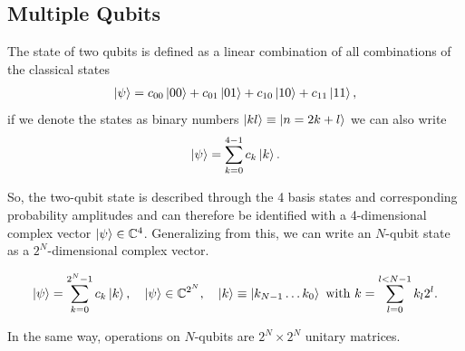 \subsection{Multiple Qubits}
\begin{def*}
The state of two qubits is defined as a linear combination of all combinations of the classical states 
\begin{align}
    \ket{\psi} = c_{00}\ket{00} + c_{01}\ket{01} + c_{10}\ket{10} + c_{11}\ket{11},
\end{align}
if we denote the states as binary numbers $\ket{kl} \equiv \ket{n=2k+l}$ we can also write
\begin{align}
    \ket{\psi} = \sum_{k=0}^{4-1} c_k \ket{k}.
\end{align}
\end{def*}
So, the two-qubit state is described through the 4 basis states and corresponding probability amplitudes and can therefore be identified with a 4-dimensional complex vector $\ket{\psi} \in \mathbb{C}^4$. Generalizing from this, we can write an $N$-qubit state as a $2^N$-dimensional complex vector.
\begin{def*}
\begin{align}
    \ket{\psi} = \sum_{k=0}^{2^N-1} c_k \ket{k}, \quad \ket{\psi}\in\mathbb{C}^{2^N},\quad \ket{k} \equiv \ket{k_{N-1}\dots k_{0}} \text{ with } k = \sum_{l=0}^{l<N-1} k_l2^l.\label{eq:n-qubit-state}
\end{align}
\end{def*}

In the same way, operations on $N$-qubits are $2^N \times 2^N$ unitary matrices.

